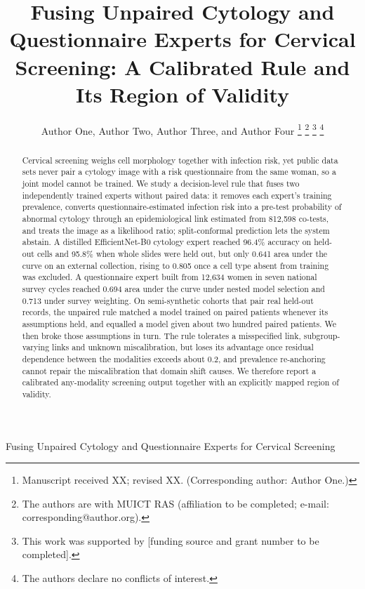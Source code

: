 \documentclass[lettersize,journal]{IEEEtran}
\begin{document}
\title{Fusing Unpaired Cytology and Questionnaire Experts for Cervical Screening: A Calibrated Rule and Its Region of Validity}

\author{Author One, Author Two, Author Three, and Author Four
\thanks{Manuscript received XX; revised XX. (Corresponding author: Author One.)}
\thanks{The authors are with MUICT RAS (affiliation to be completed; e-mail: corresponding@author.org).}
\thanks{This work was supported by [funding source and grant number to be completed].}
\thanks{The authors declare no conflicts of interest.}}

%
{Fusing Unpaired Cytology and Questionnaire Experts for Cervical Screening}

\maketitle

\begin{abstract}
Cervical screening weighs cell morphology together with infection risk, yet public data sets never pair a cytology image with a risk questionnaire from the same woman, so a joint model cannot be trained. We study a decision-level rule that fuses two independently trained experts without paired data: it removes each expert's training prevalence, converts questionnaire-estimated infection risk into a pre-test probability of abnormal cytology through an epidemiological link estimated from 812,598 co-tests, and treats the image as a likelihood ratio; split-conformal prediction lets the system abstain. A distilled EfficientNet-B0 cytology expert reached 96.4\% accuracy on held-out cells and 95.8\% when whole slides were held out, but only 0.641 area under the curve on an external collection, rising to 0.805 once a cell type absent from training was excluded. A questionnaire expert built from 12,634 women in seven national survey cycles reached 0.694 area under the curve under nested model selection and 0.713 under survey weighting. On semi-synthetic cohorts that pair real held-out records, the unpaired rule matched a model trained on paired patients whenever its assumptions held, and equalled a model given about two hundred paired patients. We then broke those assumptions in turn. The rule tolerates a misspecified link, subgroup-varying links and unknown miscalibration, but loses its advantage once residual dependence between the modalities exceeds about 0.2, and prevalence re-anchoring cannot repair the miscalibration that domain shift causes. We therefore report a calibrated any-modality screening output together with an explicitly mapped region of validity.
\end{abstract}
\end{document}

